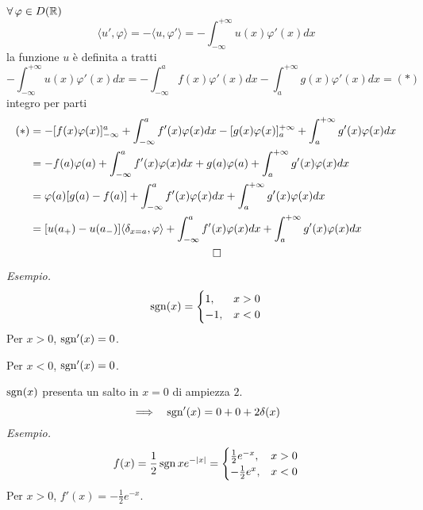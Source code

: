 $\forall \varphi \in D(\RR )$
\begin{equation*}
\langle u',\varphi \rangle =-\langle u,\varphi '\rangle =-\int ^{+\infty }_{-\infty } u( x) \varphi '( x) dx
\end{equation*}
la funzione $u$ è definita a tratti
\begin{equation*}
-\int ^{+\infty }_{-\infty } u( x) \varphi '( x) dx=-\int ^{a}_{-\infty } f( x) \varphi '( x) dx-\int ^{+\infty }_{a} g( x) \varphi '( x) dx=( *)
\end{equation*}
integro per parti
\begin{gather*}
\begin{aligned}
( *) & =-[ f( x) \varphi ( x)]^{a}_{-\infty } +\int ^{a}_{-\infty } f'( x) \varphi ( x) dx-[ g( x) \varphi ( x)]^{+\infty }_{a} +\int ^{+\infty }_{a} g'( x) \varphi ( x) dx\\
 & =-f( a) \varphi ( a) +\int ^{a}_{-\infty } f'( x) \varphi ( x) dx+g( a) \varphi ( a) +\int ^{+\infty }_{a} g'( x) \varphi ( x) dx\\
 & =\varphi ( a)[ g( a) -f( a)] +\int ^{a}_{-\infty } f'( x) \varphi ( x) dx+\int ^{+\infty }_{a} g'( x) \varphi ( x) dx\\
 & =[ u( a_{+}) -u( a_{-})] \langle \delta _{x=a} ,\varphi \rangle +\int ^{a}_{-\infty } f'( x) \varphi ( x) dx+\int ^{+\infty }_{a} g'( x) \varphi ( x) dx
\end{aligned}\\
\qed 
\end{gather*}
\textit{Esempio.}
\begin{equation*}
\operatorname{sgn}( x) =\begin{cases}
1, & x >0\\
-1, & x< 0
\end{cases}
\end{equation*}
Per $x >0$, $\operatorname{sgn} '( x) =0$.

Per $x< 0$, $\operatorname{sgn} '( x) =0$.

$\operatorname{sgn}( x)$ presenta un salto in $x=0$ di ampiezza $2$.
\begin{equation*}
\implies \ \ \operatorname{sgn} '( x) =0+0+2\delta ( x)
\end{equation*}
\textit{Esempio.}
\begin{equation*}
f( x) =\frac{1}{2}\operatorname{sgn} xe^{-| x| } =\begin{cases}
\frac{1}{2} e^{-x} , & x >0\\
-\frac{1}{2} e^{x} , & x< 0
\end{cases}
\end{equation*}
Per $x >0$, $f'( x) =-\frac{1}{2} e^{-x}$.

